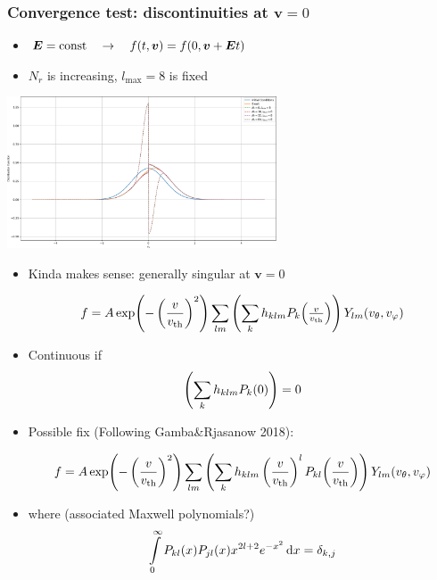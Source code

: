 \documentclass[mathserif, aspectratio=169]{beamer}
\newcommand{\ud}{\,\mathrm{d}}
\newcommand{\vect}[1]{\boldsymbol{#1}}
\newcommand{\of}[1]{\mleft( #1 \mright)}
\newcommand{\vth}{v_{\textrm{th}}}
\newcommand{\myint}{\int\limits}
\newcommand{\vr}{v}
\newcommand{\vtheta}{v_{\theta}}
\newcommand{\vphi}{v_{\varphi}}
\begin{document}
\begin{frame}
\frametitle{Convergence test: discontinuities at $\vect{v} = 0$}
\begin{itemize}
\item 
$\vect{E} = \text{const} \quad \rightarrow \quad f\of{t,\vect{v}} = f\of{0, \vect{v} + \vect{E}t}$
\item $N_r$ is increasing, $l_{\max} = 8$ is fixed
\end{itemize}
\begin{center}
\includegraphics[width=0.6\textwidth]{figures/advection_operator_test_nr}
\end{center}
\end{frame}

\begin{frame}
\begin{itemize}

\item Kinda makes sense: generally singular at $\vect{v} = 0$

\begin{align*}
f = A 
\exp\of{-\left(\frac{\vr}{\vth}\right)^2} 
\sum_{lm} \left(\sum_{k} h_{klm} P_k\of{\textstyle\frac{v}{\vth}}\right) Y_{lm}\of{\vtheta,\vphi}
\end{align*}

\item Continuous if 
\begin{align*}
\left(\sum_{k} h_{klm} P_k\of{0}\right) = 0
\end{align*}
\end{itemize}
%
\end{frame}

\begin{frame}
\begin{itemize}

\item Possible fix (Following Gamba\&Rjasanow 2018):

\begin{align*}
f = A 
\exp\of{-\left(\frac{\vr}{\vth}\right)^2} 
\sum_{lm} \left(\sum_{k} h_{klm} \left(\frac{v}{\vth}\right)^l P_{kl}\of{\frac{v}{\vth}}\right) Y_{lm}\of{\vtheta,\vphi}
\end{align*}

\item where (associated Maxwell polynomials?)
\begin{align*}
\myint_0^\infty  P_{kl}\of{x} P_{jl}\of{x} x^{2l+2} e^{-x^2} \ud x = \delta_{k,j}
\end{align*}
\end{itemize}
%
\end{frame}
\end{document}
